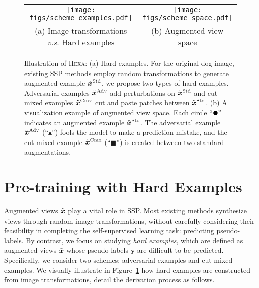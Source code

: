 \documentclass[10pt,twocolumn,letterpaper]{article}
\newcommand{\xv}{\boldsymbol{x}}
\newcommand{\yv}{\boldsymbol{y}}
\newcommand{\shortname}{\textsc{Hexa}}
\newcommand{\blackcircle}{
~{\leavevmode\put(0,2.83){\circle*{5.5}}}~
}
\begin{document}
\begin{figure*}[t!]\vspace{-0mm}\centering
	\begin{tabular}{c c}
		\hspace{-4mm}
		\texttt{[image: figs/scheme\_examples.pdf]}  & 
\hspace{-6mm}
		\texttt{[image: figs/scheme\_space.pdf]} \\
		(a) Image transformations {\em v.s.} Hard examples \vspace{2mm} & 
		\hspace{-6mm}
		(b) Augmented view space \hspace{-0mm} \\ 
	\end{tabular}
	\vspace{-3mm}
	\caption{Illustration of \shortname{}: (a) Hard examples. For the original dog image, existing SSP methods employ random transformations to generate augmented example $\Tilde{\xv}^{\text{Std}}$, we propose two types of hard examples. Adversarial examples $\Tilde{\xv}^{\text{Adv}}$ add perturbations on $\Tilde{\xv}^{\text{Std}}$ and cut-mixed examples $\Tilde{\xv}^{\text{Cmx}}$ cut and paste patches between $\Tilde{\xv}^{\text{Std}}$. (b) A visualization example of augmented view space. Each circle ``$\blackcircle{}$'' indicates an augmented example $\Tilde{\xv}^{\text{Std}}$. The adversarial example $\Tilde{\xv}^{\text{Adv}}$ (``$\blacktriangle$'') fools the model to make a prediction mistake, and the cut-mixed example $\Tilde{\xv}^{\text{Cmx}}$ (``$\blacksquare$'') is created between two standard augmentations.
	 }
	\vspace{-3mm}
	\label{fig:hard_example_illustration}
\end{figure*}



\section{Pre-training with Hard Examples}
Augmented views $\Tilde{\xv}$ play a vital role in SSP. Most existing methods synthesize views through random image transformations, without carefully considering their feasibility in completing the self-supervised learning task: predicting pseudo-labels. By contrast, we focus on studying {\em hard examples}, which are defined as augmented views $ \Tilde{\xv}$ whose pseudo-labels $\yv$ are difficult to be predicted. Specifically, we consider two schemes: adversarial examples and cut-mixed examples. We visually illustrate in Figure~\ref{fig:hard_example_illustration} how hard examples are constructed from image transformations, detail the derivation process as follows. 
\end{document}
